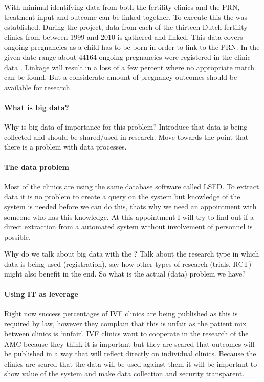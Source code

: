 With minimal identifying data from both the fertility clinics and the PRN, treatment input and outcome can be linked together.
To execute this the \project{} was established.
During the project, data from each of the thirteen Dutch fertility clinics from between 1999 and 2010 is gathered and linked.
This data covers ongoing pregnancies as a child has to be born in order to link to the PRN.
In the given date range about 44164 ongoing pregnancies were registered in the clinic data \cite{ivfReportNVOG}.
Linkage will result in a loss of a few percent where no appropriate match can be found.
But a considerate amount of pregnancy outcomes should be available for research.

\paragraph{What is big data?}
Why is big data of importance for this problem?
Introduce that data is being collected and should be shared/used in research.
Move towards the point that there is a problem with data processes.

\paragraph{The data problem}
Most of the clinics are using the same database software called LSFD. 
To extract data it is no problem to create a query on the system but knowledge of the system is needed before we can do this, thats why we need an appointment with someone who has this knowledge. 
At this appointment I will try to find out if a direct extraction from a automated system without involvement of personnel is possible.

Why do we talk about big data with the \project{}?
Talk about the research type in which data is being used (registration), say how other types of research (trials, RCT) might also benefit in the end.
So what is the actual (data) problem we have?

\paragraph{Using IT as leverage}
Right now success percentages of IVF clinics are being published as this is required by law, however they complain that this is unfair as the patient mix between clinics is ‘unfair’. 
IVF clinics want to cooperate in the research of the AMC because they think it is important but they are scared that outcomes will be published in a way that will reflect directly on individual clinics.
Because the clinics are scared that the data will be used against them it will be important to show value of the system and make data collection and security transparent.

